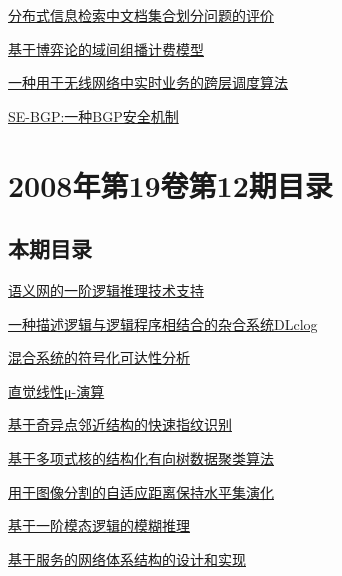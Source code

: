 \documentclass[a4paper]{article}
\begin{document}
\href{http://www.jos.org.cn/ch/reader/download_pdf.aspx?file_no=20080114&year_id=2008&quarter_id=1&falg=1}{分布式信息检索中文档集合划分问题的评价}

\href{http://www.jos.org.cn/ch/reader/download_pdf.aspx?file_no=20080115&year_id=2008&quarter_id=1&falg=1}{基于博弈论的域间组播计费模型}

\href{http://www.jos.org.cn/ch/reader/download_pdf.aspx?file_no=20080116&year_id=2008&quarter_id=1&falg=1}{一种用于无线网络中实时业务的跨层调度算法}

\href{http://www.jos.org.cn/ch/reader/download_pdf.aspx?file_no=20080117&year_id=2008&quarter_id=1&falg=1}{SE-BGP:一种BGP安全机制}


\section{\textbf{2008年第19卷第12期目录}}
\subsection{本期目录}
\href{http://www.jos.org.cn/ch/reader/download_pdf.aspx?file_no=20081201&year_id=2008&quarter_id=12&falg=1}{语义网的一阶逻辑推理技术支持}

\href{http://www.jos.org.cn/ch/reader/download_pdf.aspx?file_no=20081202&year_id=2008&quarter_id=12&falg=1}{一种描述逻辑与逻辑程序相结合的杂合系统DLclog}

\href{http://www.jos.org.cn/ch/reader/download_pdf.aspx?file_no=20081203&year_id=2008&quarter_id=12&falg=1}{混合系统的符号化可达性分析}

\href{http://www.jos.org.cn/ch/reader/download_pdf.aspx?file_no=20081204&year_id=2008&quarter_id=12&falg=1}{直觉线性μ-演算}

\href{http://www.jos.org.cn/ch/reader/download_pdf.aspx?file_no=20081205&year_id=2008&quarter_id=12&falg=1}{基于奇异点邻近结构的快速指纹识别}

\href{http://www.jos.org.cn/ch/reader/download_pdf.aspx?file_no=20081206&year_id=2008&quarter_id=12&falg=1}{基于多项式核的结构化有向树数据聚类算法}

\href{http://www.jos.org.cn/ch/reader/download_pdf.aspx?file_no=20081207&year_id=2008&quarter_id=12&falg=1}{用于图像分割的自适应距离保持水平集演化}

\href{http://www.jos.org.cn/ch/reader/download_pdf.aspx?file_no=20081208&year_id=2008&quarter_id=12&falg=1}{基于一阶模态逻辑的模糊推理}

\href{http://www.jos.org.cn/ch/reader/download_pdf.aspx?file_no=20081209&year_id=2008&quarter_id=12&falg=1}{基于服务的网络体系结构的设计和实现}
\end{document}
